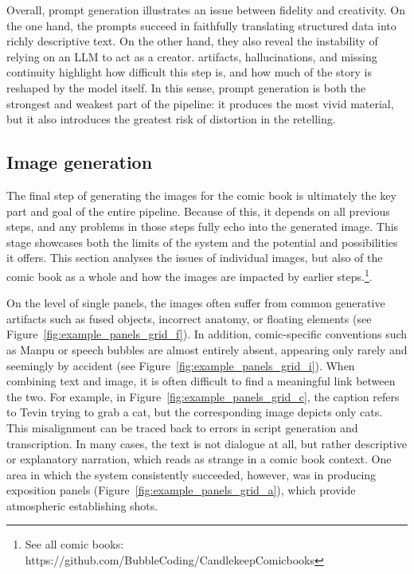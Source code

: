 Overall, prompt generation illustrates an issue between fidelity and creativity. On the one hand, the prompts succeed in faithfully translating structured data into richly descriptive text. On the other hand, they also reveal the instability of relying on an LLM to act as a creator. artifacts, hallucinations, and missing continuity highlight how difficult this step is, and how much of the story is reshaped by the model itself. In this sense, prompt generation is both the strongest and weakest part of the pipeline: it produces the most vivid material, but it also introduces the greatest risk of distortion in the retelling.

\subsection*{Image generation}
The final step of generating the images for the comic book is ultimately the key part and goal of the entire pipeline. Because of this, it depends on all previous steps, and any problems in those steps fully echo into the generated image. This stage showcases both the limits of the system and the potential and possibilities it offers. This section analyses the issues of individual images, but also of the comic book as a whole and how the images are impacted by earlier steps.\footnote{See all comic books: https://github.com/BubbleCoding/CandlekeepComicbooks}.

On the level of single panels, the images often suffer from common generative artifacts such as fused objects, incorrect anatomy, or floating elements (see Figure~\ref{fig:example_panels_grid_f}). In addition, comic-specific conventions such as Manpu or speech bubbles are almost entirely absent, appearing only rarely and seemingly by accident (see Figure~\ref{fig:example_panels_grid_i}). When combining text and image, it is often difficult to find a meaningful link between the two. For example, in Figure~\ref{fig:example_panels_grid_c}, the caption refers to Tevin trying to grab a cat, but the corresponding image depicts only cats. This misalignment can be traced back to errors in script generation and transcription. In many cases, the text is not dialogue at all, but rather descriptive or explanatory narration, which reads as strange in a comic book context. One area in which the system consistently succeeded, however, was in producing exposition panels (Figure~\ref{fig:example_panels_grid_a}), which provide atmospheric establishing shots.

